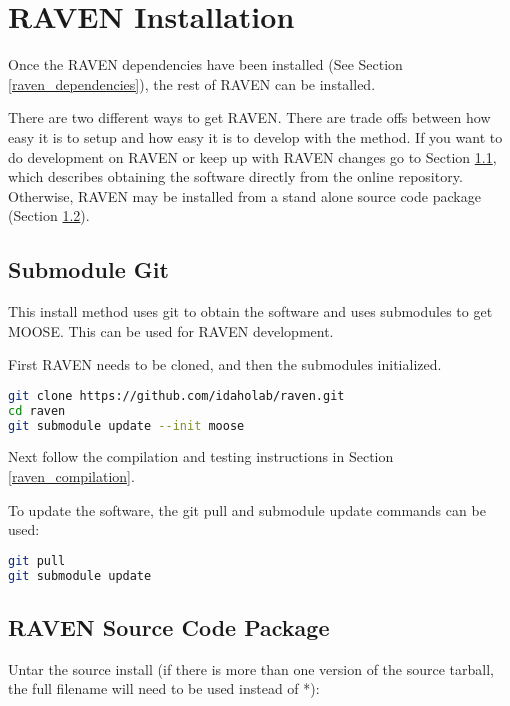 \goToRavenInstallation

\section{RAVEN Installation}
\label{raven_installation}

Once the RAVEN dependencies have been installed (See Section
\ref{raven_dependencies}), the rest of RAVEN can be installed.

There are two different ways to get RAVEN.  There are trade offs
between how easy it is to setup and how easy it is to develop with the
method.  If you want to do development on RAVEN or keep up with RAVEN
changes go to Section \ref{submodule_git}, which describes obtaining
the software directly from the online repository.  Otherwise, RAVEN
may be installed from a stand alone source code package (Section
\ref{raven_source_package}).


\subsection{Submodule Git}
\label{submodule_git}

This install method uses git to obtain the software and uses
submodules to get MOOSE.  This can be used for RAVEN development.

First RAVEN needs to be cloned, and then the submodules initialized.

\begin{lstlisting}[language=bash]
git clone https://github.com/idaholab/raven.git
cd raven
git submodule update --init moose
\end{lstlisting}

Next follow the compilation and testing instructions in Section \ref{raven_compilation}.

To update the software, the git pull and submodule update commands can
be used:

\begin{lstlisting}[language=bash]
git pull
git submodule update
\end{lstlisting}


\subsection{RAVEN Source Code Package}
\label{raven_source_package}

Untar the source install (if there is more than one version of the
source tarball, the full filename will need to be used instead of *):

